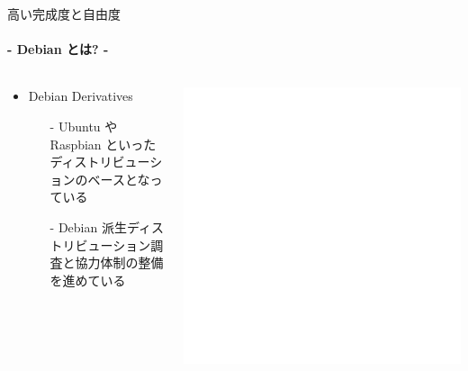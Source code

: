 \documentclass[cjk,dvipdfmx,14pt,compress,fragile]{beamer}
\begin{document}
\begin{frame}[c,fragile]{高い完成度と自由度}
  \framesubtitle{- Debian とは? -}
  \begin{columns}[c]
    \begin{column}{.69\linewidth}
      \begin{itemize}
      \item %
        Debian Derivatives
        \begin{itemize}
        \item[-]
          Ubuntu や Raspbian といったディストリビューションのベースとなっている
        \item[-]
          Debian 派生ディストリビューション調査と協力体制の整備を進めている
        \end{itemize}
      \end{itemize}
    \end{column}
    \begin{column}{.3\linewidth}
      \centering
      \includegraphics[height=.8\textheight]{image201701/blank.png}
    \end{column}
  \end{columns}
\end{frame}
\end{document}
